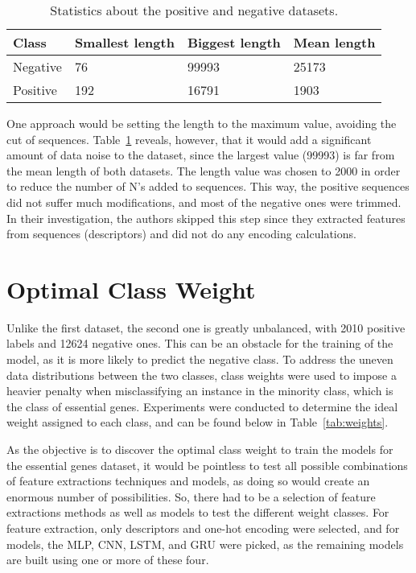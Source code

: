 \begin{table}[ht]
	\caption{Statistics about the positive and negative datasets.}
	\label{tab:stats}
    \centering
    \begin{tabular}{llll}
    	\toprule
    	\textbf{Class} & \textbf{Smallest length} & \textbf{Biggest length} & \textbf{Mean length}\\\midrule
    	
    	Negative & 76 & 99993 & 25173\\\midrule
        Positive & 192 & 16791 & 1903\\
        
    	\bottomrule
    \end{tabular}
\end{table}

One approach would be setting the length to the maximum value, avoiding the cut of sequences. Table~\ref{tab:stats} reveals, however, that it would add a significant amount of data noise to the dataset, since the largest value (99993) is far from the mean length of both datasets. The length value was chosen to 2000 in order to reduce the number of N's added to sequences. This way, the positive sequences did not suffer much modifications, and most of the negative ones were trimmed. In their investigation, the authors skipped this step since they extracted features from sequences (descriptors) and did not do any encoding calculations.

\section{Optimal Class Weight}

Unlike the first dataset, the second one is greatly unbalanced, with 2010 positive labels and 12624 negative ones. This can be an obstacle for the training of the model, as it is more likely to predict the negative class. To address the uneven data distributions between the two classes, class weights were used to impose a heavier penalty when misclassifying an instance in the minority class, which is the class of essential genes. Experiments were conducted to determine the ideal weight assigned to each class, and can be found below in Table~\ref{tab:weights}.

As the objective is to discover the optimal class weight to train the models for the essential genes dataset, it would be pointless to test all possible combinations of feature extractions techniques and models, as doing so would create an enormous number of possibilities. So, there had to be a selection of feature extractions methods as well as models to test the different weight classes. For feature extraction, only descriptors and one-hot encoding were selected, and for models, the \gls{MLP}, \gls{CNN}, \gls{LSTM}, and \gls{GRU} were picked, as the remaining models are built using one or more of these four.

